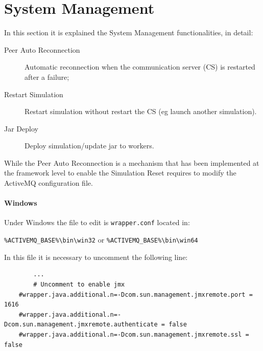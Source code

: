 \documentclass{article}
\begin{document}
\begin{figure}[ht!]
\end{figure}

\section{System Management}

In this section it is explained the System Management functionalities, in detail:
\begin{description}
	\item[Peer Auto Reconnection] Automatic reconnection when the communication server (CS) is restarted after a failure;
	\item[Restart Simulation] Restart simulation without restart the CS (eg launch another simulation).
	\item[Jar Deploy] Deploy simulation/update jar to workers.
\end{description}

While the Peer Auto Reconnection is a mechanism that has been implemented at the framework level to enable the Simulation Reset requires to modify the ActiveMQ configuration file.

\paragraph*{Windows}
Under Windows the file to edit is \texttt{wrapper.conf} located in: 

\verb|%ACTIVEMQ_BASE%\bin\win32| or \verb|%ACTIVEMQ_BASE%\bin\win64|

In this file it is necessary to uncomment the following line:

\begin{lstlisting}
    	...
    	# Uncomment to enable jmx
	#wrapper.java.additional.n=-Dcom.sun.management.jmxremote.port = 1616
	#wrapper.java.additional.n=-Dcom.sun.management.jmxremote.authenticate = false
	#wrapper.java.additional.n=-Dcom.sun.management.jmxremote.ssl = false
\end{lstlisting}
\end{document}
